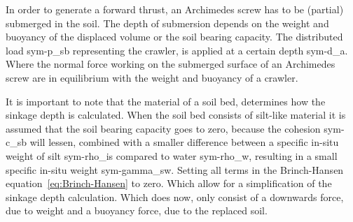 In order to generate a forward thrust, an Archimedes screw has to be (partial) submerged in the soil. The depth of
submersion depends on the weight and buoyancy of the displaced volume or the soil bearing capacity. The distributed load
\gls{sym-p_sb} representing the crawler, is applied at a certain depth \gls{sym-d_a}. Where the normal force working on
the submerged surface of an Archimedes screw are in equilibrium with the weight and buoyancy of a crawler.

It is important to note that the material of a soil bed, determines how the sinkage depth is calculated. When the soil
bed consists of silt-like material it is assumed that the soil bearing capacity goes to zero, because the cohesion
\gls{sym-c_sb} will lessen, combined with a smaller difference between a specific in-situ weight of silt
\gls{sym-rho_is} compared to water \gls{sym-rho_w}, resulting in a small specific in-situ weight \gls{sym-gamma_sw}.
Setting all terms in the Brinch-Hansen equation~\ref{eq:Brinch-Hansen} to zero. Which allow for a simplification of the
sinkage depth calculation. Which does now, only consist of a downwards force, due to weight and a buoyancy force, due to
the replaced soil.

